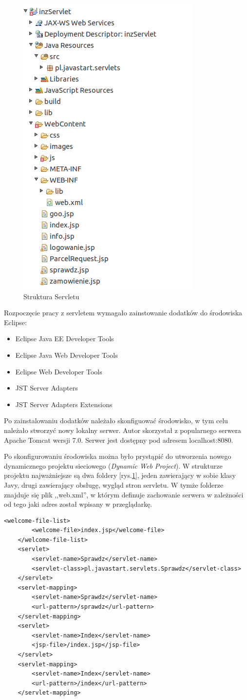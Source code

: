 \documentclass[eng,printmode,oneside]{mgr}
\begin{document}
\begin{figure}
\centering
\captionsetup{justification=centering,margin=0cm}
\vspace{-10pt}
\begin{center}
\includegraphics[width=.3\textwidth]{strukturaServlet.png}
\end{center}
\vspace{-10pt}
  \caption{Struktura Servletu}
\label{servlet}
\vspace{-60pt}
\end{figure}

Rozpoczęcie pracy z servletem wymagało zainstowanie dodatków do środowiska
Eclipse:
\begin{itemize}
  \item Eclipse Java EE Developer Tools
  \item Eclipse Java Web Developer Tools
  \item Eclipse Web Developer Tools
  \item JST Server Adapters
  \item JST Server Adapters Extensions
\end{itemize}
Po zainstalowaniu dodatków należało skonfiguować środowisko, w tym celu należało
stworzyć nowy lokalny serwer. Autor skorzystał z popularnego serwera Apache
Tomcat wersji 7.0. Serwer jest dostępny pod adresem localhost:8080. 

Po skonfigurowaniu środowiska można było prystąpić do utworzenia nowego
dynamicznego projektu sieciowego (\textsl{Dynamic Web Project}). W strukturze
projektu najważniejsze są dwa foldery [rys.\ref{servlet}], jeden zawierający w
sobie klasy Javy, drugi zawierający obsługę, wygląd stron servletu. W tymże
folderze znajduje się plik ,,web.xml'', w którym definuje zachowanie serwera w
zależności od tego jaki adres został wpisany w przeglądarkę. 

\lstset{language=XML,firstnumber=1,stepnumber=1}
\begin{lstlisting}[caption=Fragment pliku web.xml,label=webxml]
	<welcome-file-list>
		<welcome-file>index.jsp</welcome-file>
	</welcome-file-list>
	<servlet>
		<servlet-name>Sprawdz</servlet-name>
		<servlet-class>pl.javastart.servlets.Sprawdz</servlet-class>
	</servlet>
	<servlet-mapping>
		<servlet-name>Sprawdz</servlet-name>
		<url-pattern>/sprawdz</url-pattern>
	</servlet-mapping>
	<servlet>
		<servlet-name>Index</servlet-name>
		<jsp-file>/index.jsp</jsp-file>
	</servlet>
	<servlet-mapping>
		<servlet-name>Index</servlet-name>
		<url-pattern>/index</url-pattern>
	</servlet-mapping>
\end{lstlisting}
\end{document}

